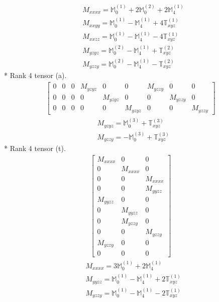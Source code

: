 \documentclass[fleqn,8pt,landscape]{jsarticle}
\begin{document}
\begin{align*}
& M_{xxxx} = \mathbb{M}_{0}^{(1)} + 2 \mathbb{M}_{0}^{(2)} + 2 \mathbb{M}_{4}^{(1)} \\
& M_{xxyy} = \mathbb{M}_{0}^{(1)} - \mathbb{M}_{4}^{(1)} + 4 \mathbb{T}_{xyz}^{(1)} \\
& M_{xxzz} = \mathbb{M}_{0}^{(1)} - \mathbb{M}_{4}^{(1)} - 4 \mathbb{T}_{xyz}^{(1)} \\
& M_{yzyz} = \mathbb{M}_{0}^{(2)} - \mathbb{M}_{4}^{(1)} + \mathbb{T}_{xyz}^{(2)} \\
& M_{yzzy} = \mathbb{M}_{0}^{(2)} - \mathbb{M}_{4}^{(1)} - \mathbb{T}_{xyz}^{(2)}
\end{align*}
* Rank 4 tensor (a).
\begin{align*}
\begin{bmatrix} 0 & 0 & 0 & M_{yzyz} & 0 & 0 & M_{yzzy} & 0 & 0 \\ 0 & 0 & 0 & 0 & M_{yzyz} & 0 & 0 & M_{yzzy} & 0 \\ 0 & 0 & 0 & 0 & 0 & M_{yzyz} & 0 & 0 & M_{yzzy} \end{bmatrix}
\end{align*}
\begin{align*}
& M_{yzyz} = \mathbb{M}_{0}^{(3)} + \mathbb{T}_{xyz}^{(3)} \\
& M_{yzzy} = - \mathbb{M}_{0}^{(3)} + \mathbb{T}_{xyz}^{(3)}
\end{align*}
* Rank 4 tensor (t).
\begin{align*}
\begin{bmatrix} M_{xxxx} & 0 & 0 \\ 0 & M_{xxxx} & 0 \\ 0 & 0 & M_{xxxx} \\ 0 & 0 & M_{yyzz} \\ M_{yyzz} & 0 & 0 \\ 0 & M_{yyzz} & 0 \\ 0 & M_{yzzy} & 0 \\ 0 & 0 & M_{yzzy} \\ M_{yzzy} & 0 & 0 \\ 0 & 0 & 0 \end{bmatrix}
\end{align*}
\begin{align*}
& M_{xxxx} = 3 \mathbb{M}_{0}^{(1)} + 2 \mathbb{M}_{4}^{(1)} \\
& M_{yyzz} = \mathbb{M}_{0}^{(1)} - \mathbb{M}_{4}^{(1)} + 2 \mathbb{T}_{xyz}^{(1)} \\
& M_{yzzy} = \mathbb{M}_{0}^{(1)} - \mathbb{M}_{4}^{(1)} - 2 \mathbb{T}_{xyz}^{(1)}
\end{align*}
\end{document}
